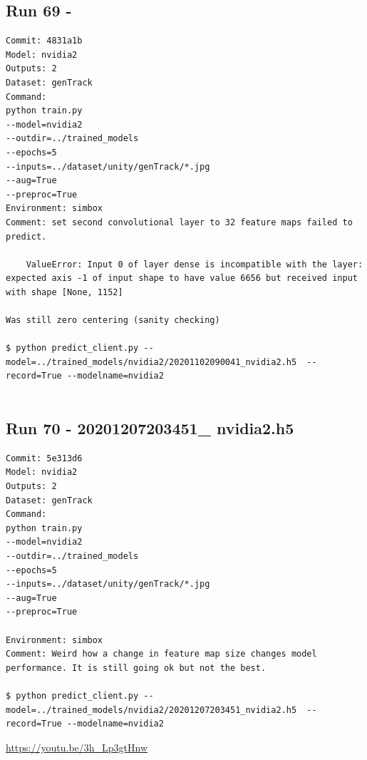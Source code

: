 \subsection{Run 69 - }
\begin{verbatim}
Commit: 4831a1b
Model: nvidia2
Outputs: 2
Dataset: genTrack
Command:
python train.py
--model=nvidia2
--outdir=../trained_models
--epochs=5
--inputs=../dataset/unity/genTrack/*.jpg
--aug=True
--preproc=True
Environment: simbox
Comment: set second convolutional layer to 32 feature maps failed to predict.

    ValueError: Input 0 of layer dense is incompatible with the layer: expected axis -1 of input shape to have value 6656 but received input with shape [None, 1152]

Was still zero centering (sanity checking)

$ python predict_client.py --model=../trained_models/nvidia2/20201102090041_nvidia2.h5  --record=True --modelname=nvidia2


\end{verbatim}

\subsection{Run 70 - 20201207203451\_ nvidia2.h5 }
\begin{verbatim}
Commit: 5e313d6 
Model: nvidia2
Outputs: 2
Dataset: genTrack   
Command:
python train.py
--model=nvidia2
--outdir=../trained_models
--epochs=5
--inputs=../dataset/unity/genTrack/*.jpg
--aug=True
--preproc=True

Environment: simbox
Comment: Weird how a change in feature map size changes model performance. It is still going ok but not the best.

$ python predict_client.py --model=../trained_models/nvidia2/20201207203451_nvidia2.h5  --record=True --modelname=nvidia2

\end{verbatim}
\url{https://youtu.be/3h_Lp3gtHnw}

